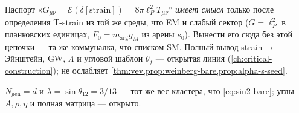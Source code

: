 \begin{remark}
\label{rem:channel-gr-open-in-book}
Паспорт «$G_{\mu\nu}=\mathcal{E}(\delta[\mathrm{strain}])=8\pi\ell_P^{2}T_{\mu\nu}$''
\emph{имеет смысл} только после определения T-strain из той же среды, что EM и слабый сектор
($G=\ell_P^{2}$ в планковских единицах, $F_0=m_{\mathrm{arg}}g_M$ из арены $s_0$).
Вынести его сюда без этой цепочки --- та же коммуналка, что списком SM.
Полный вывод strain$\to$Эйнштейн, GW, $\Lambda$ и угловой шаблон $\theta_f$ ---
открытая линия (\cref{ch:critical-construction}); не ослабляет \cref{thm:vev,prop:weinberg-bare,prop:alpha-s-seed}.
\end{remark}

\begin{remark}
$N_{\mathrm{gen}}=d$ и $\lambda=\sin\theta_{12}=3/13$ --- тот же вес кластера, что
\eqref{eq:sin2-bare}; углы $A,\rho,\eta$ и полная матрица --- открыто.
\end{remark}
